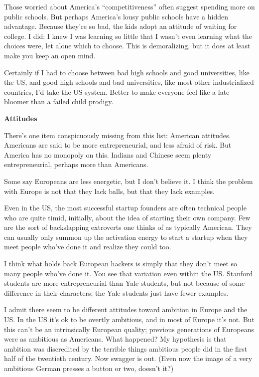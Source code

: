 Those worried about America's ``competitiveness'' often suggest spending
more on public schools. But perhaps America's lousy public schools have
a hidden advantage. Because they're so bad, the kids adopt an attitude
of waiting for college. I did; I knew I was learning so little that I
wasn't even learning what the choices were, let alone which to choose.
This is demoralizing, but it does at least make you keep an open mind.

Certainly if I had to choose between bad high schools and good
universities, like the US, and good high schools and bad universities,
like most other industrialized countries, I'd take the US system. Better
to make everyone feel like a late bloomer than a failed child prodigy.

\textbf{Attitudes}

There's one item conspicuously missing from this list: American
attitudes. Americans are said to be more entrepreneurial, and less
afraid of risk. But America has no monopoly on this. Indians and Chinese
seem plenty entrepreneurial, perhaps more than Americans.

Some say Europeans are less energetic, but I don't believe it. I think
the problem with Europe is not that they lack balls, but that they lack
examples.

Even in the US, the most successful startup founders are often technical
people who are quite timid, initially, about the idea of starting their
own company. Few are the sort of backslapping extroverts one thinks of
as typically American. They can usually only summon up the activation
energy to start a startup when they meet people who've done it and
realize they could too.

I think what holds back European hackers is simply that they don't meet
so many people who've done it. You see that variation even within the
US. Stanford students are more entrepreneurial than Yale students, but
not because of some difference in their characters; the Yale students
just have fewer examples.

I admit there seem to be different attitudes toward ambition in Europe
and the US. In the US it's ok to be overtly ambitious, and in most of
Europe it's not. But this can't be an intrinsically European quality;
previous generations of Europeans were as ambitious as Americans. What
happened? My hypothesis is that ambition was discredited by the terrible
things ambitious people did in the first half of the twentieth century.
Now swagger is out. (Even now the image of a very ambitious German
presses a button or two, doesn't it?)

